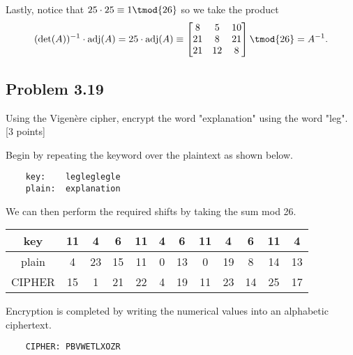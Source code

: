 \documentclass[../hw_sols.tex]{subfiles}
\begin{document}
\begin{description}
\begin{solution}
Lastly, notice that $25 \cdot 25 \equiv 1 \tmod{26}$ so we take the product
	$$(\det(A))^{-1} \cdot \text{adj}(A) 
	= 25 \cdot \text{adj}(A) 
	\equiv 
	\begin{bmatrix}
		 8 &  5 & 10 \\ 
		21 &  8 & 21 \\ 
		21 & 12 & 8
	\end{bmatrix} 
	\tmod{26} = A^{-1}.$$

\end{solution}

\end{description}


\newpage



\subsection*{Problem 3.19}

Using the Vigenère cipher, encrypt the word "explanation" using the word 
"leg". [3 points]

\begin{solution}

Begin by repeating the keyword over the plaintext as shown below.
\begin{verbatim}
    key:    legleglegle
    plain:  explanation
\end{verbatim}

We can then perform the required shifts by taking the sum mod 26.
	\begin{center}
	\begin{tabular}{ *{12}{| c } | }
		\hline
		   key & 11 &  4 &  6 & 11 & 4 &  6 & 11 &  4 &  6 & 11 &  4 \\
		\hline
		 plain &  4 & 23 & 15 & 11 & 0 & 13 &  0 & 19 &  8 & 14 & 13 \\
		\hline
		CIPHER & 15 &  1 & 21 & 22 & 4 & 19 & 11 & 23 & 14 & 25 & 17 \\
		\hline
	\end{tabular}
	\end{center}

Encryption is completed by writing the numerical values into an alphabetic 
ciphertext.
\begin{verbatim}
    CIPHER: PBVWETLXOZR
\end{verbatim}

\end{solution}
\end{document}
